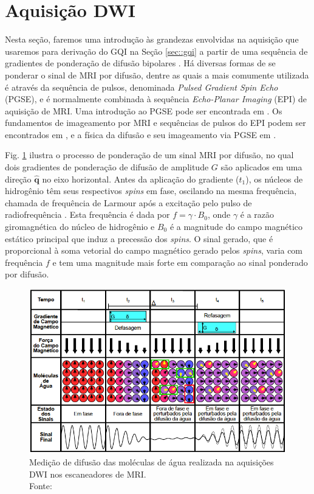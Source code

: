 \documentclass[
    12pt,                %
    oneside,            %
    a4paper,            %
    english,            %
    french,                %
    spanish,            %
    brazil                %
    ]{abntex2}
\begin{document}
\section{Aquisição DWI}
\label{sec::aquisicao_dwi}
Nesta seção, faremos uma introdução às grandezas envolvidas na aquisição que usaremos para derivação do GQI na Seção \ref{sec::gqi} a partir de uma sequência de gradientes de ponderação de difusão bipolares \cite{mori2013}. Há diversas formas de se ponderar o sinal de MRI por difusão, dentre as quais a mais comumente utilizada é através da sequência de pulsos, denominada \textit{Pulsed Gradient Spin Echo} (PGSE), e é normalmente combinada à sequência \textit{Echo-Planar Imaging} (EPI) de aquisição de MRI. Uma introdução ao PGSE pode ser encontrada em . Os fundamentos de imageamento por MRI e sequências de pulsos do EPI podem ser encontrados em , e a física da difusão e seu imageamento via PGSE em .

Fig. \ref{fig::pgse_ilustrado} ilustra o processo de ponderação de um sinal MRI por difusão, no qual dois gradientes de ponderação de difusão de amplitude $G$ são aplicados em uma direção $\mathbf{\hat{q}}$ no eixo horizontal. Antes da aplicação do gradiente ($t_1$), os núcleos de hidrogênio têm seus respectivos \textit{spins} em fase, oscilando na mesma frequência, chamada de frequência de Larmour  após a excitação pelo pulso de radiofrequência \cite{mori2013}. Esta frequência é dada por  $f = \gamma \cdot B_0$, onde $\gamma$ é a razão giromagnética do núcleo de hidrogênio e $B_0$ é a magnitude do campo magnético estático principal que induz a precessão dos \textit{spins}. O sinal gerado, que é proporcional à soma vetorial do campo magnético gerado pelos \textit{spins}, varia com frequência $f$ e tem uma magnitude mais forte em comparação ao sinal ponderado por difusão.

\begin{figure}[ht]
    \centering
    \includegraphics[width=.8\linewidth, angle=0]{figs/HARDI/pgse2.png}
    \caption{Medição de difusão das moléculas de água realizada na aquisições DWI nos escaneadores de MRI. \\
    Fonte: \cite{voltoline2016}
    }
    \label{fig::pgse_ilustrado}
   \hspace{1pt}
\end{figure}
\end{document}
